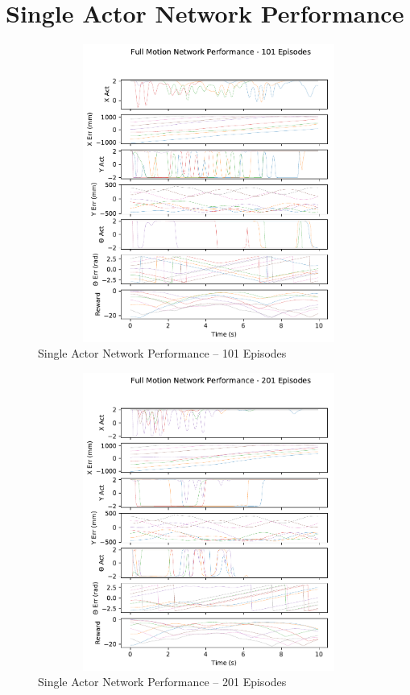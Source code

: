 \chapter{Single Actor Network Performance}
\label{appendix:all_perf}
\begin{figure}[H]
	\centering
	\includegraphics[width=6in, height=3.85in, keepaspectratio]{figures/train_figs/all_transitions/3_101.pdf}
	\caption{Single Actor Network Performance -- 101 Episodes}
\end{figure}
\begin{figure}[H]
	\centering
	\includegraphics[width=6in, height=3.85in, keepaspectratio]{figures/train_figs/all_transitions/3_201.pdf}
	\caption{Single Actor Network Performance -- 201 Episodes}
\end{figure}
